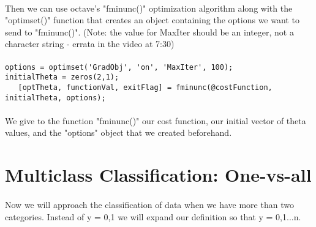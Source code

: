 \documentclass[UTF8]{ctexart}
\begin{document}
\paragraph{}
Then we can use octave's "fminunc()" optimization algorithm along with the "optimset()" function that creates an object containing the options we want to send to "fminunc()". (Note: the value for MaxIter should be an integer, not a character string - errata in the video at 7:30)
\paragraph{}
\begin{algorithm}
\begin{verbatim}
options = optimset('GradObj', 'on', 'MaxIter', 100);
initialTheta = zeros(2,1);
   [optTheta, functionVal, exitFlag] = fminunc(@costFunction, initialTheta, options);
\end{verbatim}
\end{algorithm}
\paragraph{}
We give to the function "fminunc()" our cost function, our initial vector of theta values, and the "options" object that we created beforehand.
\newpage
\section{Multiclass Classification: One-vs-all}
\paragraph{}
Now we will approach the classification of data when we have more than two categories. Instead of y = {0,1} we will expand our definition so that y = {0,1...n}.
\end{document}
